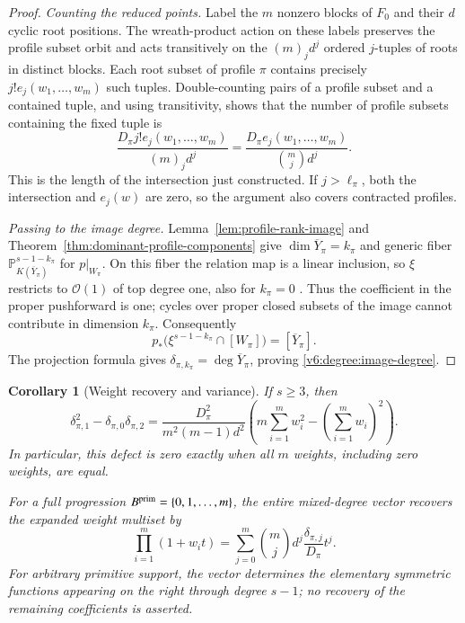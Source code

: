 \documentclass[10pt,fleqn]{article}
\numberwithin{equation}{section}
\newtheorem{corollary}[theorem]{Corollary}
\newcommand{\PP}{\mathbb P}
\begin{document}
\begin{proof}
\emph{Counting the reduced points.}
Label the $m$ nonzero blocks of $F_0$ and their $d$ cyclic root
positions.  The wreath-product action on these labels preserves the profile
subset orbit and acts transitively on the $(m)_jd^j$ ordered
$j$-tuples of roots in distinct blocks.  Each root subset of profile $\pi$ contains precisely
$j!e_j(w_1,\ldots,w_m)$ such tuples.  Double-counting pairs of a
profile subset and a contained tuple, and using transitivity,
shows that the number of profile subsets containing the fixed
tuple is
\[
 \frac{D_\pi j!e_j(w_1,\ldots,w_m)}{(m)_j d^j}
 =\frac{D_\pi e_j(w_1,\ldots,w_m)}{\binom mj d^j}.
\]
This is the length of the intersection just constructed.  If
$j>\ell_\pi$, both the intersection and $e_j(w)$ are zero, so
the argument also covers contracted profiles.

\emph{Passing to the image degree.}
Lemma~\ref{lem:profile-rank-image} and
Theorem~\ref{thm:dominant-profile-components} give
$\dim\overline Y_\pi=k_\pi$ and generic fiber
$\PP^{s-1-k_\pi}_{K(\overline Y_\pi)}$ for $p|_{W_\pi}$.
On this fiber the relation map is a linear inclusion, so $\xi$
restricts to $\mathcal O(1)$ of top degree one, also for $k_\pi=0$
\cite[Tags 02TW and 02R4]{Stacks}.  Thus the coefficient in the
proper pushforward is one; cycles over proper closed subsets of the
image cannot contribute in dimension $k_\pi$.  Consequently
\[
 p_*\bigl(\xi^{s-1-k_\pi}\cap[W_\pi]\bigr)
 =[\overline Y_\pi].
\]
The projection formula gives
$\delta_{\pi,k_\pi}=\deg\overline Y_\pi$, proving
\eqref{v6:degree:image-degree}.
\end{proof}

\begin{corollary}[Weight recovery and variance]
\label{v6:degree:recovery}
If $s\ge3$, then
\begin{equation}\label{v6:degree:variance}
 \delta_{\pi,1}^2-\delta_{\pi,0}\delta_{\pi,2}
 =\frac{D_\pi^2}{m^2(m-1)d^2}
   \left(m\sum_{i=1}^m w_i^2-
                   \left(\sum_{i=1}^m w_i\right)^2\right).
\end{equation}
In particular, this defect is zero exactly when all $m$ weights,
including zero weights, are equal.

For a full progression $B^{\rm prim}=\{0,1,\ldots,m\}$, the entire
mixed-degree vector recovers the expanded weight multiset by
\begin{equation}\label{v6:degree:generating-polynomial}
 \boxed{\displaystyle
 \prod_{i=1}^m(1+w_i t)
 =\sum_{j=0}^m\binom mj d^j
      \frac{\delta_{\pi,j}}{D_\pi}t^j.}
\end{equation}
For arbitrary primitive support, the vector determines the
elementary symmetric functions appearing on the right through
degree $s-1$; no recovery of the remaining coefficients is asserted.
\end{corollary}
\end{document}

